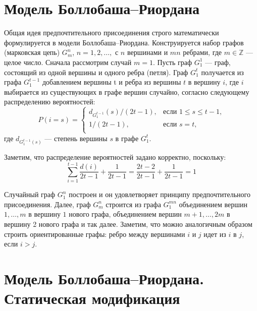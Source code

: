 \documentclass[14pt]{extreport}
\begin{document}
\section{Модель Боллобаша--Риордана}

Общая идея предпочтительного присоединения строго математически формулируется в модели Боллобаша--Риордана. Конструируется набор графов (марковская цепь) $G_m^n$, $n=1, 2, \dots,$ с $n$ вершинами и $mn$ ребрами, где $m \in \mathbb{Z}$ --- целое число. Сначала рассмотрим случай $m = 1$. Пусть граф $G_1^1$ --- граф, состоящий из одной вершины и одного ребра (петля). Граф $G_1^t$ получается из графа $G_1^{t-1}$ добавлением вершины t и ребра из вершины $t$ в вершину $i$, где $i$ выбирается из существующих в графе вершин случайно, согласно следующему распределению вероятностей:
$$  
P(i=s) =
\begin{cases}  
  d_{G_1^{t-1}}(s)/(2t-1),&\text{если $1 \leqslant s \leqslant t-1$,}\\
  1/(2t-1),&\text{если $s=t$,}\\
\end{cases}
$$  
где $d_{G_1^{t-1}(s)}$ --- степень вершины $s$ в графе $G_1^t$. 

Заметим, что распределение вероятностей задано корректно, поскольку:
$$
\sum_{i=1}^{t-1}\frac{d(i)}{2t-1} + \frac{1}{2t-1}=\frac{2t-2}{2t-1}+\frac{1}{2t-1}=1
$$

Случайный граф $G_1^n$ построен и он удовлетворяет принципу предпочтительного присоединения. Далее, граф $G_m^n$ строится из графа $G_1^{mn}$ объединением вершин $1, \dots, m$ в вершину $1$ нового графа, объединением вершин $m+1, \dots, 2m$ в вершину 2 нового графа и так далее. Заметим, что можно аналогичным образом строить ориентированные графы: ребро между вершинами $i$ и $j$ идет из $i$ в $j$, если $i > j$.

\section{Модель Боллобаша--Риордана. Статическая модификация}
\end{document}
